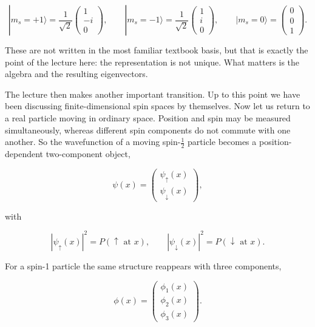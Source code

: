 \begin{equation}
|m_s=+1\rangle
=
\frac{1}{\sqrt2}
\begin{pmatrix}
1\\
-i\\
0
\end{pmatrix},
\qquad
|m_s=-1\rangle
=
\frac{1}{\sqrt2}
\begin{pmatrix}
1\\
i\\
0
\end{pmatrix},
\qquad
|m_s=0\rangle
=
\begin{pmatrix}
0\\
0\\
1
\end{pmatrix}.
\end{equation}

These are not written in the most familiar textbook basis, but that is exactly the point of the lecture here: the representation is not unique. What matters is the algebra and the resulting eigenvectors.

The lecture then makes another important transition. Up to this point we have been discussing finite-dimensional spin spaces by themselves. Now let us return to a real particle moving in ordinary space. Position and spin may be measured simultaneously, whereas different spin components do not commute with one another. So the wavefunction of a moving spin-\(\tfrac12\) particle becomes a position-dependent two-component object,

\begin{equation}
\psi(x)=
\begin{pmatrix}
\psi_\uparrow(x)\\
\psi_\downarrow(x)
\end{pmatrix},
\end{equation}

with

\begin{equation}
|\psi_\uparrow(x)|^2=P(\uparrow \text{ at }x),
\qquad
|\psi_\downarrow(x)|^2=P(\downarrow \text{ at }x).
\end{equation}

For a spin-1 particle the same structure reappears with three components,

\begin{equation}
\phi(x)=
\begin{pmatrix}
\phi_1(x)\\
\phi_2(x)\\
\phi_3(x)
\end{pmatrix}.
\end{equation}

